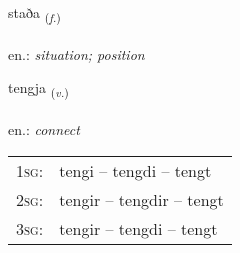 \documentclass[frontgrid, backgrid]{flacards}\usepackage[]{graphicx}\usepackage[]{xcolor}
\begin{document}
\renewcommand{\blhead}{\vskip5pt {\small\bfseries\footnotesize Nafnorð | Noun }}
\renewcommand{\bcfoot}{\vskip5pt \hspace{2pt}{\small\bfseries\footnotesize 1K}}


{staða \small{\textsubscript{(\textit{f.})}} \\[1ex] %
\textphonetic{[staːða]} \\
en.: \emph{situation; position} \\  [2ex]
\renewcommand*{\arraystretch}{0.8}
}

\renewcommand{\flhead}{\vskip5pt \fboxsep=0pt {\small\bfseries\footnotesize Sagnorð | Verb}}
\renewcommand{\fcfoot}{\vskip5pt \fboxsep=0pt \hspace{2pt}{\small\bfseries\footnotesize 1K}}

\renewcommand{\blhead}{\vskip5pt {\small\bfseries\footnotesize Sagnorð | Verb }}
\renewcommand{\bcfoot}{\vskip5pt \hspace{2pt}{\small\bfseries\footnotesize 1K}}


{tengja \small{\textsubscript{(\textit{v.})}} \\[1ex] %
\textphonetic{[tʰeiɲca]} \\
en.: \emph{connect} \\  [2ex]
\renewcommand*{\arraystretch}{0.8}
\begin{tabular}{p{1cm}l}
\textsc{1sg}: & tengi -- tengdi -- tengt \\ 
\textsc{2sg}: & tengir -- tengdir -- tengt \\ 
\textsc{3sg}: & tengir -- tengdi -- tengt \\ 
\end{tabular}
}

\renewcommand{\flhead}{\vskip5pt \fboxsep=0pt {\small\bfseries\footnotesize Nafnorð | Noun}}
\renewcommand{\fcfoot}{\vskip5pt \fboxsep=0pt \hspace{2pt}{\small\bfseries\footnotesize 1K}}
\end{document}
